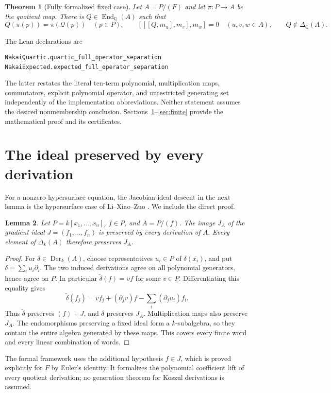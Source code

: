 \documentclass[11pt,letterpaper]{article}
\newtheorem{theorem}{Theorem}[section]
\newtheorem{lemma}[theorem]{Lemma}
\theoremstyle{remark}\newtheorem{remark}[theorem]{Remark}
\DeclareMathOperator{\Der}{Der}
\DeclareMathOperator{\End}{End}
\newcommand{\QQ}{\mathbb Q}
\begin{document}
\begin{theorem}[Fully formalized fixed case]\label{thm:fixed}
Let \(A=P/(F)\) and let \(\pi:P\to A\) be the quotient map. There is
\(Q\in\End_{\QQ}(A)\) such that
\[
 Q(\pi(p))=\pi(\mathcal Q(p))\quad(p\in P),
 \qquad [[[Q,m_u],m_v],m_w]=0\quad(u,v,w\in A),
 \qquad Q\notin\Delta_{\QQ}(A).
\]
\end{theorem}
The Lean declarations are
\begin{lstlisting}
NakaiQuartic.quartic_full_operator_separation
NakaiExpected.expected_full_operator_separation
\end{lstlisting}
The latter restates the literal ten-term polynomial, multiplication maps,
commutators, explicit polynomial operator, and unrestricted generating set
independently of the implementation abbreviations. Neither statement assumes
the desired nonmembership conclusion. Sections~\ref{sec:stable}--\ref{sec:finite}
provide the mathematical proof and its certificates.

\section{The ideal preserved by every derivation}\label{sec:stable}
For a nonzero hypersurface equation, the Jacobian-ideal descent in the next
lemma is the hypersurface case of Li--Xiao--Zuo
\cite[Theorem 2.7, pp.~4--5]{LXZ}. We include the direct proof.
\begin{lemma}\label{lem:stable}
Let \(P=k[x_1,\ldots,x_n]\), \(f\in P\), and \(A=P/(f)\).
The image \(J_A\) of the gradient ideal \(J=(f_1,\ldots,f_n)\)
is preserved by every derivation of \(A\). Every element of
\(\Delta_k(A)\) therefore preserves \(J_A\).
\end{lemma}
\begin{proof}
For \(\delta\in\Der_k(A)\), choose representatives \(u_i\in P\) of
\(\delta(\overline{x_i})\), and put
\(\widetilde\delta=\sum_i u_i\partial_i\).
The two induced derivations agree on all polynomial generators, hence agree
on \(P\). In particular \(\widetilde\delta(f)=vf\) for some \(v\in P\).
Differentiating this equality gives
\begin{equation}\label{eq:stability}
 \widetilde\delta(f_j)=v f_j+(\partial_jv)f
                      -\sum_i(\partial_ju_i)f_i.
\end{equation}
Thus \(\widetilde\delta\) preserves \((f)+J\), and \(\delta\) preserves
\(J_A\). Multiplication maps also preserve \(J_A\). The endomorphisms
preserving a fixed ideal form a \(k\)-subalgebra, so they contain the entire
algebra generated by these maps. This covers every finite word and every
linear combination of words.
\end{proof}
The formal framework uses the additional hypothesis \(f\in J\), which is
proved explicitly for \(F\) by Euler's identity. It formalizes the polynomial
coefficient lift of every quotient derivation; no generation theorem for
Koszul derivations is assumed.
\end{document}
